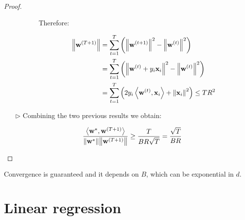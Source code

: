 \documentclass[../../main/main.tex]{subfiles}
\begin{document}
\begin{proof}
\begin{itemize}
\begin{itemize}
\begin{itemize}
                            Therefore:

                            \begin{align}
                                \norm{\mathbf{w}^{(T+1)}}
                                &=
                                \sum_{t=1}^{T} \left( \norm{\mathbf{w}^{(t+1)}}^2 - \norm{\mathbf{w}^{(t)}}^2 \right)   \nonumber   \\
                                &=
                                \sum_{t=1}^{T} \left( \norm{\mathbf{w}^{(t)} + y_i \mathbf{x}_i}^2 - \norm{\mathbf{w}^{(t)}}^2 \right)   \nonumber   \\
                                &=
                                \sum_{t=1}^{T} \left( 2 y_i \left\langle \mathbf{w}^{(t)}, \mathbf{x}_i \right\rangle + \norm{\mathbf{x}_i}^2 \right)
                                \le
                                TR^2
                                \label{eq:C5_T1P_5}
                            \end{align}

                    \end{itemize}
            \end{itemize}

        \item[$\triangleright$] Combining the two previous results we obtain:

            \begin{equation}
                \frac{\left\langle \mathbf{w}^*, \mathbf{w}^{(T+1)} \right\rangle}{\norm{\mathbf{w}^*} \norm{\mathbf{w}^{(T+1)}}}
                \ge
                \frac{T}{BR \sqrt{T}}
                =
                \frac{\sqrt{T}}{BR}
                \label{eq:C5_T1P_6}
            \end{equation}

    \end{itemize}
\end{proof}

\begin{remark}
    Convergence is guaranteed and it depends on \( B \), which can be exponential in \( d \).
\end{remark}





\section{Linear regression}
\end{document}
